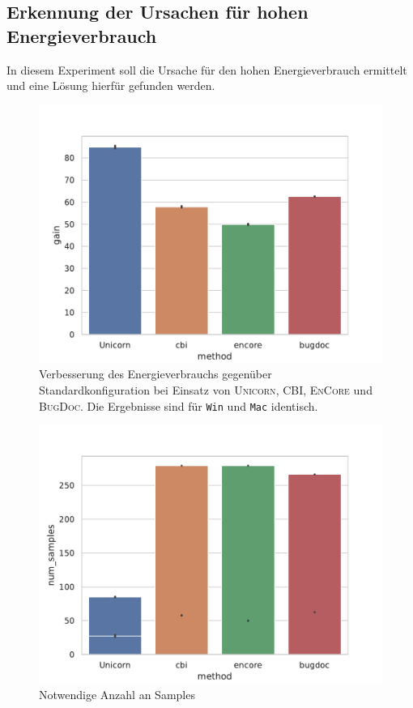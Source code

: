 \documentclass[11pt]{article}
\begin{document}
\subsection{Erkennung der Ursachen für hohen Energieverbrauch}\label{sec:1}

In diesem Experiment soll die Ursache für den hohen Energieverbrauch ermittelt und eine Lösung hierfür gefunden werden.

\begin{figure}[tp!]
  \centering
  \includegraphics[width=\linewidth]{./img/win_debug_gain.pdf}
  \caption{Verbesserung des Energieverbrauchs gegenüber Standardkonfiguration bei Einsatz von \textsc{Unicorn}, CBI, \textsc{EnCore} und \textsc{BugDoc}. Die Ergebnisse sind für \texttt{Win} und \texttt{Mac} identisch.}

  \label{fig:1}
\end{figure}

\begin{figure}[tp!]
  \centering
  \includegraphics[width=\linewidth]{./img/win_debug_num_samples.pdf}
  \caption{Notwendige Anzahl an Samples}

  \label{fig:3}
\end{figure}
\end{document}
